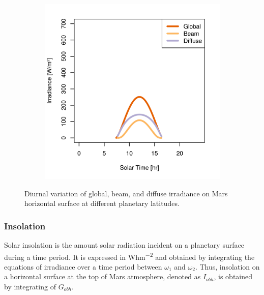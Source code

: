 \begin{figure}[h]
\begin{subfigure}[t]{\subfigureWidth}
  		\label{fig:sub:irradiance-phi-p20}
  	\end{subfigure}\hfill
	   \begin{subfigure}[t]{\subfigureWidth}
      \centering
  		\includegraphics[height=\graphicsHeight]{sections/mars-solar-energy/solar-radiation/plots/gh-gbh-gdh-variation-4-for-ls-248-phi-40-tau-05-and-albedo-027.png}
  		\label{fig:sub:irradiance-phi-p40}
	   \end{subfigure}\hfill
	\caption{Diurnal variation of global, beam, and diffuse irradiance on Mars horizontal surface at different planetary latitudes.}
	\label{fig:plot:irradiances-phi}
\vspace{-2ex}
\end{figure}

\clearpage
\subsubsection{Insolation}
\label{sec:MartianEnvironment:SolarRadiation:Insolation}

Solar insolation is the amount solar radiation incident on a planetary surface during a time period. It is expressed in \si{Whm^{-2}} and obtained by integrating the equations of irradiance over a time period between $\omega_1$ and $\omega_2$. Thus, insolation on a horizontal surface at the top of Mars atmosphere, denoted as $I_{obh}$, is obtained by integrating  of $G_{obh}$.


